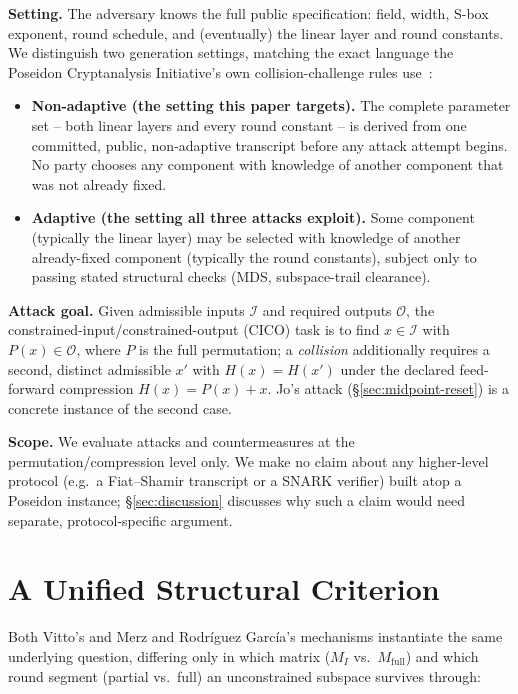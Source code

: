 \documentclass[conference]{IEEEtran}
\theoremstyle{definition}
\theoremstyle{plain}
\begin{document}
\textbf{Setting.} The adversary knows the full public specification:
field, width, S-box exponent, round schedule, and (eventually) the
linear layer and round constants. We distinguish two generation
settings, matching the exact language the Poseidon Cryptanalysis
Initiative's own collision-challenge rules use~\cite{jo2026}:

\begin{itemize}[leftmargin=1.2em]
  \item \textbf{Non-adaptive (the setting this paper targets).} The
  complete parameter set -- both linear layers and every round constant
  -- is derived from one committed, public, non-adaptive transcript
  before any attack attempt begins. No party chooses any component with
  knowledge of another component that was not already fixed.
  \item \textbf{Adaptive (the setting all three attacks exploit).} Some
  component (typically the linear layer) may be selected with knowledge
  of another already-fixed component (typically the round constants),
  subject only to passing stated structural checks (MDS, subspace-trail
  clearance).
\end{itemize}

\textbf{Attack goal.} Given admissible inputs $\mathcal I$ and required
outputs $\mathcal O$, the constrained-input/constrained-output (CICO)
task is to find $x\in\mathcal I$ with $P(x)\in\mathcal O$, where $P$ is
the full permutation; a \emph{collision} additionally requires a second,
distinct admissible $x'$ with $H(x)=H(x')$ under the declared
feed-forward compression $H(x)=P(x)+x$. Jo's attack
(\S\ref{sec:midpoint-reset}) is a concrete instance of the second case.

\textbf{Scope.} We evaluate attacks and countermeasures at the
permutation/compression level only. We make no claim about any
higher-level protocol (e.g.\ a Fiat--Shamir transcript or a SNARK
verifier) built atop a Poseidon instance; \S\ref{sec:discussion}
discusses why such a claim would need separate, protocol-specific
argument.

\section{A Unified Structural Criterion}
\label{sec:criterion}

Both Vitto's and Merz and Rodr\'iguez Garc\'ia's mechanisms instantiate
the same underlying question, differing only in which matrix
($M_I$ vs.\ $M_{\mathrm{full}}$) and which round segment (partial vs.\
full) an unconstrained subspace survives through:
\end{document}
